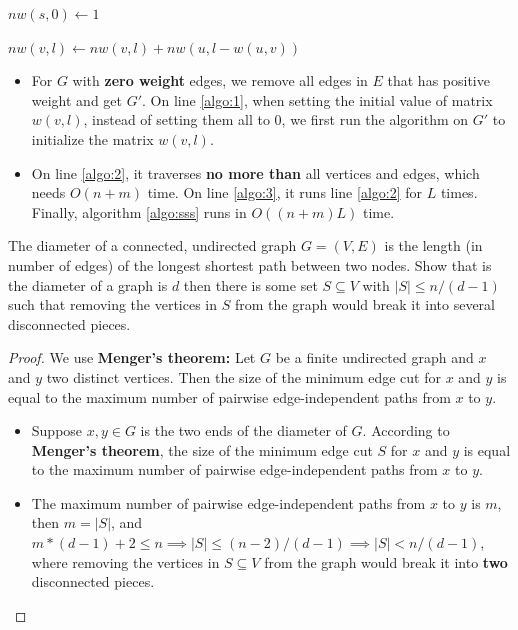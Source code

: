 \documentclass{article}
\newcounter{exercise}
\newcommand{\<}{
    \langle}
\renewcommand{\>}{
    \rangle}
\begin{document}
{\begin{algorithm}[htb]
\begin{algorithmic}[1]
        \State
        \State $nw(s,0)\leftarrow 1$
        
        \label{algo:3}

        \label{algo:2}
                    \State $nw(v,l)\leftarrow nw(v,l)+nw(u,l-w(u,v))$ 
                \EndFor
            \EndFor
        \EndFor
    \end{algorithmic}
\end{algorithm}

\begin{itemize}
    \item For $G$ with \textbf{zero weight} edges, we remove all edges in $E$ that has positive weight and get $G'$. On line \ref{algo:1}, when setting the initial value of matrix $w(v,l)$, instead of setting them all to $0$, we first run the algorithm on $G'$ to initialize the matrix $w(v,l)$.
    \item On line \ref{algo:2}, it traverses \textbf{no more than} all vertices and edges, which needs $O(n+m)$ time. On line \ref{algo:3}, it runs line \ref{algo:2} for $L$ times. Finally, algorithm \ref{algo:sss} runs in $O((n+m)L)$ time.
\end{itemize}



\begin{exercise}
The diameter of a connected, undirected graph $G=(V,E)$ is the length (in number of edges) of the longest shortest path between two nodes. Show that is the diameter of a graph is $d$ then there is some set $S\subseteq V$ with $|S|\leq n/(d-1)$ such that removing the vertices in $S$ from the graph would break it into several disconnected pieces.

\end{exercise}
\begin{proof} 
    \leavevmode\newline

We use \textbf{Menger's theorem:} Let $G$ be a finite undirected graph and $x$ and $y$ two distinct vertices. Then the size of the minimum edge cut for $x$ and $y$ is equal to the maximum number of pairwise edge-independent paths from $x$ to $y$.
\begin{itemize}
    \item Suppose $x,y\in G$ is the two ends of the diameter of $G$. According to \textbf{Menger's theorem}, the size of the minimum edge cut $S$ for $x$ and $y$ is equal to the maximum number of pairwise edge-independent paths from $x$ to $y$.
    \item The maximum number of pairwise edge-independent paths from $x$ to $y$ is $m$, then $m=|S|$, and $m*(d-1)+2\leq n\implies |S|\leq (n-2)/(d-1) \implies |S| < n/(d-1)$, where removing the vertices in $S\subseteq V$ from the graph would break it into \textbf{two} disconnected pieces.
\end{itemize}


\end{proof}}
\end{document}
